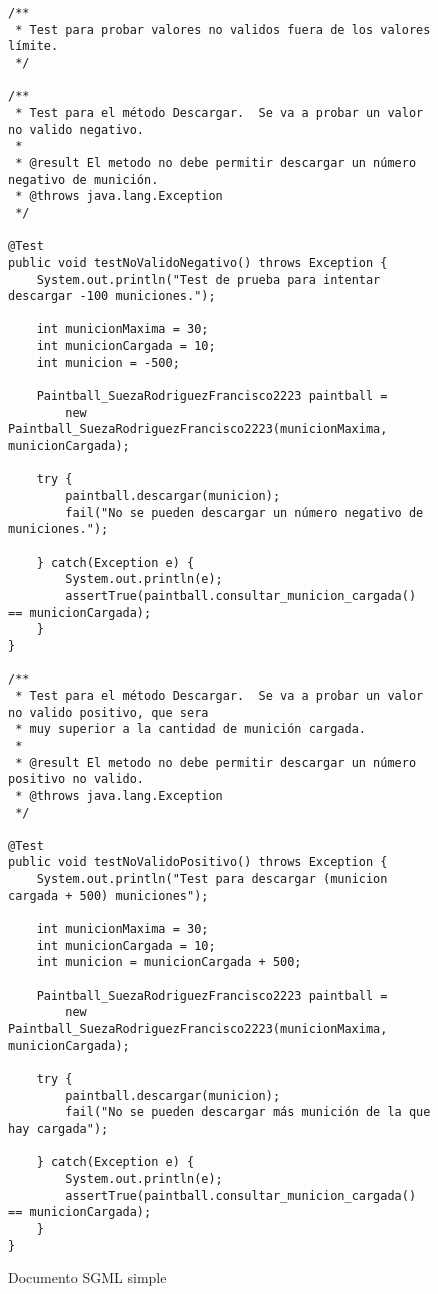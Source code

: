 \begin{figure}[H]
    \begin{tcolorbox}[sharp corners, colback=yellow!30, colframe=white!20]
        \tiny
        \begin{verbatim}
/**
 * Test para probar valores no validos fuera de los valores límite.
 */

/**
 * Test para el método Descargar.  Se va a probar un valor no valido negativo.
 *
 * @result El metodo no debe permitir descargar un número negativo de munición.
 * @throws java.lang.Exception
 */

@Test
public void testNoValidoNegativo() throws Exception {
    System.out.println("Test de prueba para intentar descargar -100 municiones.");

    int municionMaxima = 30;
    int municionCargada = 10;
    int municion = -500;

    Paintball_SuezaRodriguezFrancisco2223 paintball =
        new Paintball_SuezaRodriguezFrancisco2223(municionMaxima, municionCargada);

    try {
        paintball.descargar(municion);
        fail("No se pueden descargar un número negativo de municiones.");

    } catch(Exception e) {
        System.out.println(e);
        assertTrue(paintball.consultar_municion_cargada() == municionCargada);
    }
}

/**
 * Test para el método Descargar.  Se va a probar un valor no valido positivo, que sera
 * muy superior a la cantidad de munición cargada.
 *
 * @result El metodo no debe permitir descargar un número positivo no valido.
 * @throws java.lang.Exception
 */

@Test
public void testNoValidoPositivo() throws Exception {
    System.out.println("Test para descargar (municion cargada + 500) municiones");

    int municionMaxima = 30;
    int municionCargada = 10;
    int municion = municionCargada + 500;

    Paintball_SuezaRodriguezFrancisco2223 paintball =
        new Paintball_SuezaRodriguezFrancisco2223(municionMaxima, municionCargada);

    try {
        paintball.descargar(municion);
        fail("No se pueden descargar más munición de la que hay cargada");

    } catch(Exception e) {
        System.out.println(e);
        assertTrue(paintball.consultar_municion_cargada() == municionCargada);
    }
}
        \end{verbatim}
    \end{tcolorbox}
    \caption{Documento SGML simple}
\end{figure}

